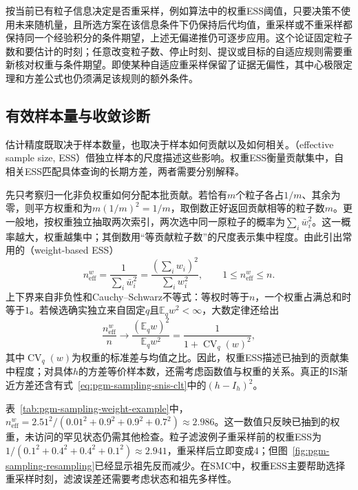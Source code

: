 按当前已有粒子信息决定是否重采样，例如算法中的权重ESS阈值，只要决策不使用未来随机量，且所选方案在该信息条件下仍保持后代均值，重采样或不重采样都保持同一个经验积分的条件期望，上述无偏递推仍可逐步应用。这个论证固定粒子数和要估计的时刻；任意改变粒子数、停止时刻、提议或目标的自适应规则需要重新核对权重与条件期望。即使某种自适应重采样保留了证据无偏性，其中心极限定理和方差公式也仍须满足该规则的额外条件。

\subsection{有效样本量与收敛诊断}
\label{sec:pgm-sampling-diagnostics}

估计精度既取决于样本数量，也取决于样本如何贡献以及如何相关。（effective sample size, ESS）借独立样本的尺度描述这些影响。权重ESS衡量贡献集中，自相关ESS匹配具体查询的长期方差，两者需要分别解释。

先只考察归一化非负权重如何分配本批贡献。若恰有$m$个粒子各占$1/m$、其余为零，则平方权重和为$m(1/m)^2=1/m$，取倒数正好返回贡献相等的粒子数$m$。更一般地，按权重独立抽取两次索引，两次选中同一原粒子的概率为$\sum_i\bar w_i^2$。这一概率越大，权重越集中；其倒数用“等贡献粒子数”的尺度表示集中程度。由此引出常用的（weight-based ESS）
\begin{equation}
  n_{\mathrm{eff}}^{w}
    =\frac{1}{\sum_i\bar w_i^2}
    =\frac{(\sum_i w_i)^2}{\sum_i w_i^2},
  \qquad 1\leq n_{\mathrm{eff}}^{w}\leq n.
  \label{eq:pgm-sampling-weight-ess}
\end{equation}
上下界来自非负性和Cauchy--Schwarz不等式：等权时等于$n$，一个权重占满总和时等于$1$。若候选确实独立来自固定$q$且$\mathbb{E}_q w^2<\infty$，大数定律还给出
\[
  \frac{n_{\mathrm{eff}}^{w}}{n}
    \longrightarrow
    \frac{(\mathbb{E}_q w)^2}{\mathbb{E}_q w^2}
    =\frac{1}{1+\operatorname{CV}_q(w)^2},
\]
其中$\operatorname{CV}_q(w)$为权重的标准差与均值之比。因此，权重ESS描述已抽到的贡献集中程度；对具体$h$的方差等价样本数，还需考虑函数值与权重的关系。真正的IS渐近方差还含有式~\eqref{eq:pgm-sampling-snis-clt}中的$(h-I_h)^2$。

表~\ref{tab:pgm-sampling-weight-example}中，$n_{\mathrm{eff}}^w=2.51^2/(0.01^2+0.9^2+0.9^2+0.7^2)\approx2.986$。这一数值只反映已抽到的权重，未访问的罕见状态仍需其他检查。粒子滤波例子重采样前的权重ESS为$1/(0.1^2+0.4^2+0.4^2+0.1^2)\approx2.941$，重采样后立即变成$4$；但图~\ref{fig:pgm-sampling-resampling}已经显示祖先反而减少。在SMC中，权重ESS主要帮助选择重采样时刻，滤波误差还需要考虑状态和祖先多样性。

